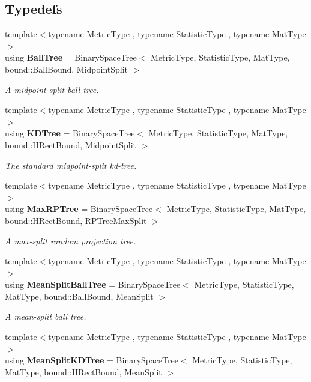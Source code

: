 \subsection*{Typedefs}
\begin{DoxyCompactItemize}
\item 
{\footnotesize template$<$typename Metric\+Type , typename Statistic\+Type , typename Mat\+Type $>$ }\\using \textbf{ Ball\+Tree} = Binary\+Space\+Tree$<$ Metric\+Type, Statistic\+Type, Mat\+Type, bound\+::\+Ball\+Bound, Midpoint\+Split $>$
\begin{DoxyCompactList}\small\item\em A midpoint-\/split ball tree. \end{DoxyCompactList}\item 
{\footnotesize template$<$typename Metric\+Type , typename Statistic\+Type , typename Mat\+Type $>$ }\\using \textbf{ K\+D\+Tree} = Binary\+Space\+Tree$<$ Metric\+Type, Statistic\+Type, Mat\+Type, bound\+::\+H\+Rect\+Bound, Midpoint\+Split $>$
\begin{DoxyCompactList}\small\item\em The standard midpoint-\/split kd-\/tree. \end{DoxyCompactList}\item 
{\footnotesize template$<$typename Metric\+Type , typename Statistic\+Type , typename Mat\+Type $>$ }\\using \textbf{ Max\+R\+P\+Tree} = Binary\+Space\+Tree$<$ Metric\+Type, Statistic\+Type, Mat\+Type, bound\+::\+H\+Rect\+Bound, R\+P\+Tree\+Max\+Split $>$
\begin{DoxyCompactList}\small\item\em A max-\/split random projection tree. \end{DoxyCompactList}\item 
{\footnotesize template$<$typename Metric\+Type , typename Statistic\+Type , typename Mat\+Type $>$ }\\using \textbf{ Mean\+Split\+Ball\+Tree} = Binary\+Space\+Tree$<$ Metric\+Type, Statistic\+Type, Mat\+Type, bound\+::\+Ball\+Bound, Mean\+Split $>$
\begin{DoxyCompactList}\small\item\em A mean-\/split ball tree. \end{DoxyCompactList}\item 
{\footnotesize template$<$typename Metric\+Type , typename Statistic\+Type , typename Mat\+Type $>$ }\\using \textbf{ Mean\+Split\+K\+D\+Tree} = Binary\+Space\+Tree$<$ Metric\+Type, Statistic\+Type, Mat\+Type, bound\+::\+H\+Rect\+Bound, Mean\+Split $>$

\end{DoxyCompactItemize}
